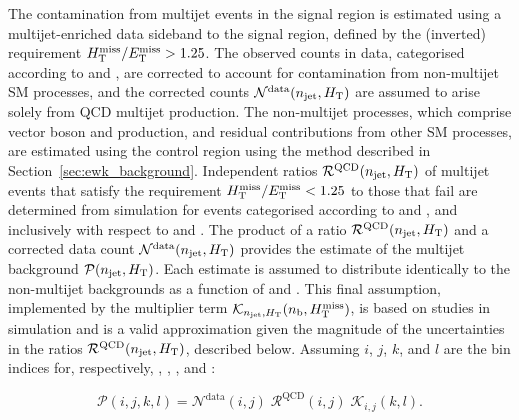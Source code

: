 The contamination from multijet events in the signal region is
estimated using a multijet-enriched data sideband to the signal
region, defined by the (inverted) requirement $H_{\mathrm{T}}^{\text{miss}} / E_{\mathrm{T}}^{\text{miss}} > 1.25$. The
observed counts in data, categorised according to \njet and \scalht,
are corrected to account for contamination from non-multijet SM
processes, and the corrected counts $\mathcal{N}^\text{data}(n_{\text{jet}},
H_{\mathrm{T}})$ are assumed to arise solely from QCD multijet
production. The non-multijet processes, which comprise vector boson
and \ttbar production, and residual contributions from other SM
processes, are estimated using the \mj control region using the method
described in Section~\ref{sec:ewk_background}. 
Independent ratios $\mathcal{R}^\text{QCD}(n_{\text{jet}}, H_{\mathrm{T}})$ of
multijet events that satisfy the requirement $H_{\mathrm{T}}^{\text{miss}} / E_{\mathrm{T}}^{\text{miss}} < 1.25$ to those
that fail are determined from simulation for events categorised
according to \njet and \scalht, and inclusively with respect to \nb
and \HTmiss. The product of a ratio $\mathcal{R}^\text{QCD}(n_{\text{jet}},
H_{\mathrm{T}})$ and a corrected data count $\mathcal{N}^\text{data}(n_{\text{jet}},
H_{\mathrm{T}})$ provides the estimate of the multijet background
$\mathcal{P}(n_{\text{jet}}, H_{\mathrm{T}})$. Each estimate is assumed to distribute
identically to the non-multijet backgrounds as a function of \nb and
\HTmiss. This final assumption, implemented by the multiplier term
$\mathcal{K}_{n_{\text{jet}}, H_{\mathrm{T}}}(n_{\text{b}}, H_{\text{T}}^{\text{miss}})$, is based on studies in
simulation and is a valid approximation given the magnitude of the
uncertainties in the ratios $\mathcal{R}^\text{QCD}(n_{\text{jet}}, H_{\mathrm{T}})$,
described below.
Assuming $i$, $j$, $k$, and $l$ are the bin indices for, respectively,
\njet, \scalht, \nb, and \HTmiss:

\begin{equation}
  \label{eq:qcd}
  \mathcal{P}( i, j, k, l ) =
  \mathcal{N}^\text{data}( i, j )\;
  \mathcal{R}^\text{QCD}( i, j )\;
  \mathcal{K}_{i,j}( k, l ).
\end{equation}


